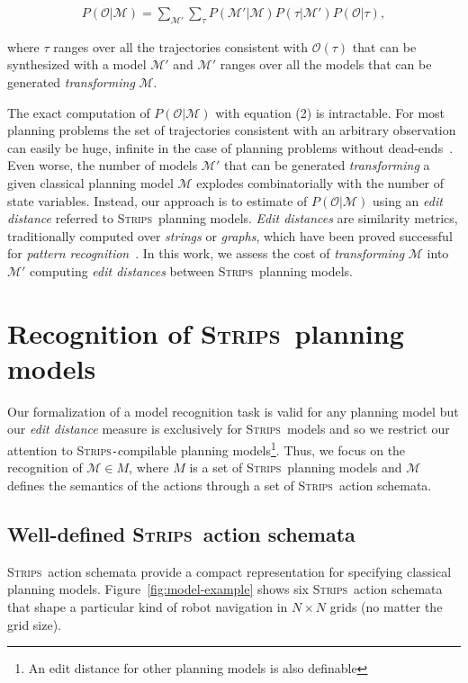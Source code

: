 \documentclass[letterpaper]{article} %
\newcommand{\strips}{\textsc{Strips}}     %
\begin{document}
\begin{align}
 P(\mathcal{O}|\mathcal{M})=\sum_{\mathcal{M}'}\sum_{\tau} P(\mathcal{M'}|\mathcal{M})P(\tau|\mathcal{M'})P(\mathcal{O}|\tau),
\end{align}

where $\tau$ ranges over all the trajectories consistent with $\mathcal{O}(\tau)$ that can be synthesized with a model $\mathcal{M}'$ and $\mathcal{M}'$ ranges over all the models that can be generated {\em transforming} $\mathcal{M}$.

The exact computation of $P(\mathcal{O}|\mathcal{M})$ with equation (2) is intractable. For most planning problems the set of trajectories consistent with an arbitrary observation can easily be huge, infinite in the case of planning problems without dead-ends~\cite{lesh1995sound}. Even worse, the number of models $\mathcal{M}'$ that can be generated {\em transforming} a given classical planning model $\mathcal{M}$ explodes combinatorially with the number of state variables. Instead, our approach is to estimate of $P(\mathcal{O}|\mathcal{M})$ using an {\em edit distance} referred to \strips\ planning models. {\em Edit distances} are similarity metrics, traditionally computed over {\em strings} or {\em graphs}, which have been proved successful for {\em pattern recognition}~\cite{MasekP80,Bunke97}. In this work, we assess the cost of {\em transforming} $\mathcal{M}$ into $\mathcal{M'}$ computing {\em edit distances} between \strips\ planning models.


\section{Recognition of \strips\ planning models}
\label{sec:asPlanning}

Our formalization of a model recognition task is valid for any planning model but our \emph{edit distance} measure is exclusively for \strips\ models and so we restrict our attention to \strips\texttt{-}compilable planning models\footnote{An edit distance for other planning models is also definable}. Thus, we focus on the recognition of $\mathcal{M}\in M$, where $M$ is a set of \strips\ planning models and $\mathcal{M}$ defines the semantics of the actions through a set of \strips\ action schemata.


\subsection{Well-defined \strips\ action schemata}
\strips\ action schemata provide a compact representation for specifying classical planning models. Figure~\ref{fig:model-example} shows six \strips\ action schemata that shape a particular kind of robot navigation in $N\times N$ grids (no matter the grid size).
\end{document}
